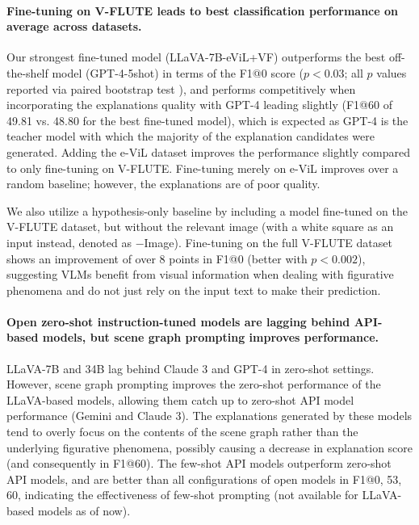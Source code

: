 \paragraph{Fine-tuning on V-FLUTE leads to best classification performance on average across datasets.} Our strongest fine-tuned model (LLaVA-7B-eViL+VF) outperforms the best off-the-shelf model (GPT-4-5shot) in terms of the F1@0 score ($p<0.03$; all $p$ values reported via paired bootstrap test \cite{koehn-2004-statistical}), and performs competitively when incorporating the explanations quality with GPT-4 leading slightly (F1@60 of 49.81 vs. 48.80 for the best fine-tuned model), which is expected as GPT-4 is the teacher model with which the majority of the explanation candidates were generated. Adding the e-ViL dataset improves the performance slightly compared to only fine-tuning on V-FLUTE. Fine-tuning merely on e-ViL improves over a random baseline; however, the explanations are of poor quality. 

We also utilize a hypothesis-only baseline \cite{poliak-etal-2018-hypothesis} by including a model fine-tuned on the V-FLUTE dataset, but without the relevant image (with a white square as an input instead, denoted as $-$Image). Fine-tuning on the full V-FLUTE dataset shows an improvement of over 8 points in F1@0 (better with $p<0.002$), suggesting VLMs benefit from visual information when dealing with figurative phenomena and do not just rely on the input text to make their prediction. 

\paragraph{Open zero-shot instruction-tuned models are lagging behind API-based models, but scene graph prompting improves performance.} LLaVA-7B and 34B lag behind Claude 3 and GPT-4 in zero-shot settings. However, scene graph prompting improves the zero-shot performance of the LLaVA-based models, allowing them catch up to zero-shot API model performance (Gemini and Claude 3). The explanations generated by these models tend to overly focus on the contents of the scene graph rather than the underlying figurative phenomena, possibly causing a decrease in explanation score (and consequently in F1@60). The few-shot API models outperform zero-shot API models, and are better than all configurations of open models in F1@0, 53, 60, indicating the effectiveness of few-shot prompting (not available for LLaVA-based models as of now). 

